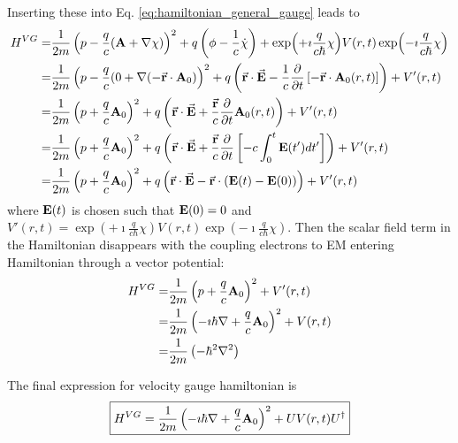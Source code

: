 \documentclass[11pt]{article}
\begin{document}
\begin{itemize}
Inserting these into  Eq. \ref{eq:hamiltonian_general_gauge} leads to
\begin{align*}
H^{VG} =& \frac{1}{2m} \left(p-\frac{q}{c}(\vb A +\nabla \chi) 
    \right)^2  + q\left( \phi  - \frac{1}{c} \dot \chi \right) + \exp(+\imath \frac{q}{c\hbar}\chi)  V(r,t) \exp(-\imath \frac{q}{c\hbar}\chi)\\
=& \frac{1}{2m} \left(p -\frac{q}{c}(0 +\nabla  (-\vec{\vb r}\cdot \vb A_0)
    \right)^2  + q\left( \vec {\vb r} \cdot \vec {\vb E}  
      -\frac{1}{c} \pdv{}{t} \left[  -\vec{\vb r}\cdot \vb A_0(r,t)  \right]\right) +V'(r,t)\\
=& \frac{1}{2m} \left(p+\frac{q}{c}  \vb A_0 \right)^2
    + q\left( \vec {\vb r} \cdot \vec {\vb E} +\frac{\vec{\vb r}}{c} \pdv{}{t}   \vb A_0(r,t) \right) +V'(r,t) \\
= &\frac{1}{2m} \left(p+\frac{q}{c}  \vb A_0 \right)^2 
    + q\left( \vec {\vb r} \cdot \vec {\vb E} +\frac{\vec{\vb r}}{c} \pdv{}{t}  \left[ -c \int_0^t \vb E(t') dt' \right]  \right) +V'(r,t) \\
=& \frac{1}{2m} \left(p+\frac{q}{c}  \vb A_0 \right)^2 
  + q\left( \vec {\vb r} \cdot \vec {\vb E} - \vec{\vb r}  \cdot \left( \vb E(t) - \vb E(0)\right)  \right) +V'(r,t)
\end{align*}
where $\vb E(t)$ is chosen such that  $\vb E(0)=0$ and
 $V'(r,t) =  \exp(+\imath \frac{q}{c\hbar}\chi)  V(r,t) \exp(-\imath \frac{q}{c\hbar}\chi)$.
Then the scalar field term in the Hamiltonian disappears  with the coupling  electrons to EM entering Hamiltonian through a vector potential:
\begin{align*}
H^{VG} =& \frac{1}{2m} \left(p+\frac{q}{c}  \vb A_0 \right)^2 + V'(r,t)\\
=&  \frac{1}{2m} \left(-\imath \hbar \nabla +\frac{q}{c}  \vb A_0 \right)^2 + V(r,t)\\
=&  \frac{1}{2m} \left( -\hbar^2 \nabla^2  \right)
\end{align*}

The final expression for velocity gauge  hamiltonian is
\begin{equation}
  \boxed{
H^{VG} = \frac{1}{2m} \left(-\imath \hbar \nabla +\frac{q}{c}  \vb A_0 \right)^2 + U V(r,t) U^\dag
\label{eq:H_vg}
}  
\end{equation}

\end{itemize}
\end{document}
